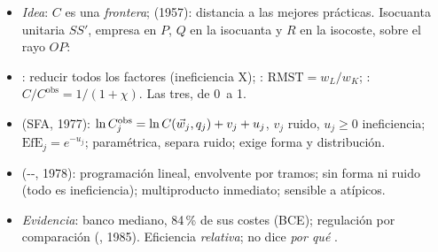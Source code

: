 \documentclass{article}
\begin{document}
\begin{columnas}
\begin{itemize}
\item \emph{Idea}: $C$ es una \emph{frontera};  (1957): distancia a las mejores prácticas. Isocuanta unitaria $SS'$, empresa en $P$, $Q$ en la isocuanta y $R$ en la isocoste, sobre el rayo $OP$:
\item {}: reducir todos los factores (ineficiencia X); : $\mathrm{RMST}=w_L/w_K$; : $C/C^{\mathrm{obs}}=1/(1+\chi)$. Las tres, de 0~a 1.
\end{itemize}
\begin{itemize}
\item {} (SFA, 1977): $\ln C_j^{\mathrm{obs}}=\ln C(\vec{w}_j,q_j)+v_j+u_j$, $v_j$ ruido, $u_j\geq0$ ineficiencia; $\mathrm{EfE}_j=e^{-u_j}$; paramétrica, separa ruido; exige forma y distribución.
\item {} (--, 1978): programación lineal, envolvente por tramos; sin forma ni ruido (todo es ineficiencia); multiproducto inmediato; sensible a atípicos.
\item \emph{Evidencia}: banco mediano, 84\,\% de sus costes (BCE); regulación por comparación (, 1985). Eficiencia \emph{relativa}; no dice \emph{por qué} .
\end{itemize}


\end{columnas}
\end{document}
